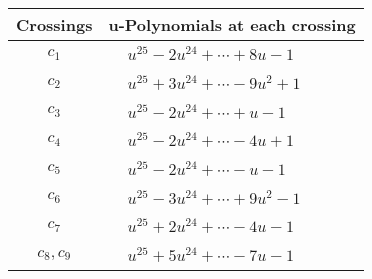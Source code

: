 \documentclass[1p]{elsarticle_modified}
\theoremstyle{definition}
\begin{document}
\begin{tabular}{m{50pt}|m{274pt}}
Crossings & \hspace{64pt}u-Polynomials at each crossing \\
\hline $$\begin{aligned}c_{1}\end{aligned}$$&$\begin{aligned}
&u^{25}-2 u^{24}+\cdots+8 u-1
\end{aligned}$\\
\hline $$\begin{aligned}c_{2}\end{aligned}$$&$\begin{aligned}
&u^{25}+3 u^{24}+\cdots-9 u^2+1
\end{aligned}$\\
\hline $$\begin{aligned}c_{3}\end{aligned}$$&$\begin{aligned}
&u^{25}-2 u^{24}+\cdots+u-1
\end{aligned}$\\
\hline $$\begin{aligned}c_{4}\end{aligned}$$&$\begin{aligned}
&u^{25}-2 u^{24}+\cdots-4 u+1
\end{aligned}$\\
\hline $$\begin{aligned}c_{5}\end{aligned}$$&$\begin{aligned}
&u^{25}-2 u^{24}+\cdots- u-1
\end{aligned}$\\
\hline $$\begin{aligned}c_{6}\end{aligned}$$&$\begin{aligned}
&u^{25}-3 u^{24}+\cdots+9 u^2-1
\end{aligned}$\\
\hline $$\begin{aligned}c_{7}\end{aligned}$$&$\begin{aligned}
&u^{25}+2 u^{24}+\cdots-4 u-1
\end{aligned}$\\
\hline $$\begin{aligned}c_{8},c_{9}\end{aligned}$$&$\begin{aligned}
&u^{25}+5 u^{24}+\cdots-7 u-1
\end{aligned}$\\

\end{tabular}
\end{document}
